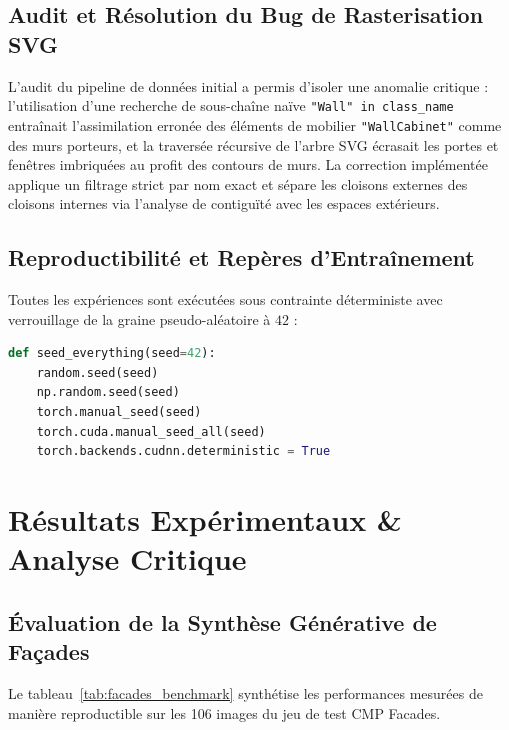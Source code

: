 \documentclass[11pt,a4paper]{report}
\begin{document}
\section{Audit et Résolution du Bug de Rasterisation SVG}
L'audit du pipeline de données initial a permis d'isoler une anomalie critique : l'utilisation d'une recherche de sous-chaîne naïve \texttt{"Wall" in class\_name} entraînait l'assimilation erronée des éléments de mobilier \texttt{"WallCabinet"} comme des murs porteurs, et la traversée récursive de l'arbre SVG écrasait les portes et fenêtres imbriquées au profit des contours de murs.
La correction implémentée applique un filtrage strict par nom exact et sépare les cloisons externes des cloisons internes via l'analyse de contiguïté avec les espaces extérieurs.

\section{Reproductibilité et Repères d'Entraînement}
Toutes les expériences sont exécutées sous contrainte déterministe avec verrouillage de la graine pseudo-aléatoire à $42$ :
\begin{lstlisting}[language=Python]
def seed_everything(seed=42):
    random.seed(seed)
    np.random.seed(seed)
    torch.manual_seed(seed)
    torch.cuda.manual_seed_all(seed)
    torch.backends.cudnn.deterministic = True
\end{lstlisting}

\newpage

\chapter{Résultats Expérimentaux \& Analyse Critique}

\section{Évaluation de la Synthèse Générative de Façades}
Le tableau~\ref{tab:facades_benchmark} synthétise les performances mesurées de manière reproductible sur les 106 images du jeu de test CMP Facades.
\end{document}
